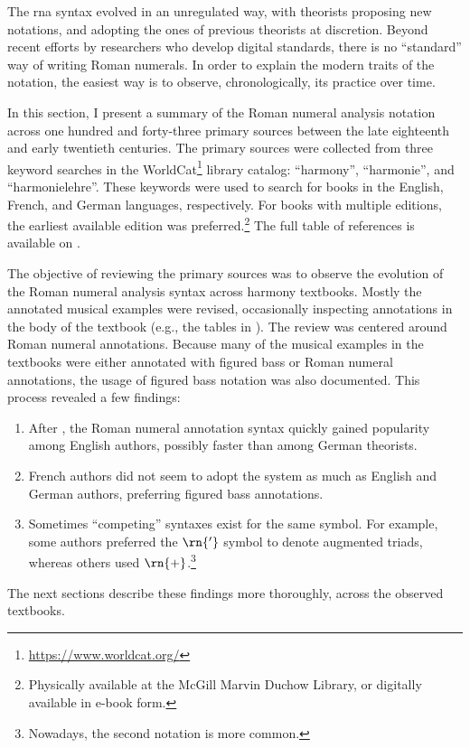 

The \gls{rna} syntax evolved in an unregulated way, with
theorists proposing new notations, and adopting the ones of
previous theorists at discretion. Beyond recent efforts by
researchers who develop digital standards, there is no
``standard'' way of writing Roman numerals. In order to
explain the modern traits of the notation, the easiest way
is to observe, chronologically, its practice over time.

In this section, I present a summary of the Roman numeral
analysis notation across one hundred and forty-three primary
sources between the late eighteenth and early twentieth
centuries. The primary sources were collected from three
keyword searches in the
WorldCat\footnote{\href{https://www.worldcat.org/}{https://www.worldcat.org/}}
library catalog: ``harmony'', ``harmonie'', and
``harmonielehre''. These keywords were used to search for
books in the English, French, and German languages,
respectively. For books with multiple editions, the earliest
available edition was preferred.\footnote{Physically
available at the McGill Marvin Duchow Library, or digitally
available in e-book form.} The full table of references is
available on .



The objective of reviewing the primary sources was to
observe the evolution of the Roman numeral analysis syntax
across harmony textbooks. Mostly the annotated musical
examples were revised, occasionally inspecting annotations
in the body of the textbook (e.g., the tables in
\textcite{kirnberger1774kunst}). The review was centered
around Roman numeral annotations. Because many of the
musical examples in the textbooks were either annotated with
figured bass or Roman numeral annotations, the usage of
figured bass notation was also documented. This process
revealed a few findings:

\begin{enumerate}
    \item After \textcite{weber1817versuch}, the Roman
    numeral annotation syntax quickly gained popularity
    among English authors, possibly faster than among German
    theorists.
    \item French authors did not seem to adopt the system as
    much as English and German authors, preferring figured
    bass annotations.
    \item Sometimes ``competing'' syntaxes exist for the
    same symbol. For example, some authors preferred the
    $\rn{'}$ symbol to denote augmented triads, whereas
    others used $\rn{+}$.\footnote{Nowadays, the second
    notation is more common.}
\end{enumerate}

The next sections describe these findings more thoroughly,
across the observed textbooks.
